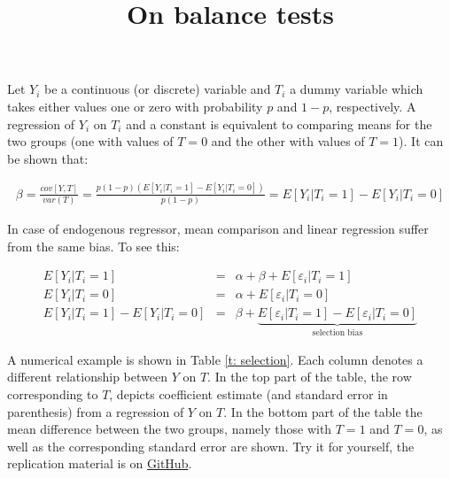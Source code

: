 \documentclass[11pt, oneside]{article}   	%
\date{}
\title{On balance tests}
\begin{document}
\maketitle
Let  $Y_i $ be a continuous (or discrete) variable and  $ T_i $ a dummy variable which takes either values one or zero with probability $p$ and $1-p$, respectively. A regression of $Y_i $ on $T_i$ and a constant is equivalent to comparing means for the two groups (one with values of $T=0$ and the other with values of $T=1$). It can be shown that:


 \begin{align*}
	\beta = \frac{cov[Y, T]}{var(T)}=\frac{p(1-p)(E[Y_i|T_i=1]- E[Y_i|T_i=0])}{p(1-p)}=E[Y_i|T_i=1]- E[Y_i|T_i=0]
 \end{align*}

In case of endogenous regressor, mean comparison and linear regression suffer from the same bias. To see this:

 \begin{align*}
 	E[Y_i|T_i=1] &=&  \alpha +  \beta  +  E[\varepsilon_i|T_i=1] \\
 	E[Y_i|T_i=0] &=&  \alpha  + E[\varepsilon_i|T_i=0]\\
 	E[Y_i|T_i=1]- E[Y_i|T_i=0] &= &  \beta +  \underset{\text{selection bias}}{\underbrace{ E[\varepsilon_i|T_i=1] -   E[\varepsilon_i|T_i=0] }}
 \end{align*}
 
\newpage

 A numerical example is shown in Table \ref{t: selection}. Each column denotes a different relationship between $Y$ on $T$. In the top part of the table, the row corresponding to $T$, depicts coefficient estimate (and standard error in parenthesis) from a regression of $Y$ on $T$.  In the bottom part of the table the mean difference between the two groups, namely those with $T=1$ and $T=0$, as well as the corresponding standard error are shown. 
 Try it for yourself, the replication material is on  \href{https://github.com/CEU-Economics-and-Business/ECBS6233-Empirical-Research/tree/master/code}{GitHub}.
\end{document}
